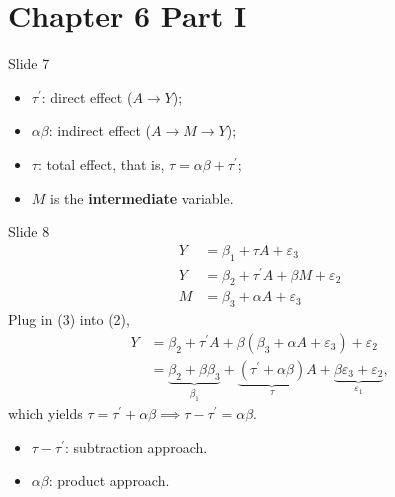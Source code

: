 \section*{Chapter 6 Part I}
\begin{Regular}{Slide 7}
    \begin{center}
    \end{center}
    \begin{itemize}
        \item $ \tau^\prime $: direct effect ($ A\to Y $);
        \item $ \alpha\beta $: indirect effect ($ A\to M\to Y $);
        \item $ \tau $: total effect, that is, $ \tau=\alpha\beta+\tau^\prime $;
        \item $ M $ is the \textbf{intermediate} variable.
    \end{itemize}
\end{Regular}
\begin{Regular}{Slide 8}
    \begin{align}
        Y & =\beta_1+\tau A + \varepsilon_3               \\
        Y & =\beta_2+\tau^\prime A+\beta M +\varepsilon_2 \\
        M & =\beta_3+\alpha A+\varepsilon_3
    \end{align}
    Plug in (3) into (2),
    \begin{align*}
        Y
         & =\beta_2+\tau^\prime A +\beta(\beta_3+\alpha A+\varepsilon_3)+\varepsilon_2                                                                                \\
         & =\underbrace{\beta_2+\beta\beta_3}_{\beta_1}+\underbrace{(\tau^\prime+\alpha\beta)}_{\tau}A+\underbrace{\beta\varepsilon_3+\varepsilon_2}_{\varepsilon_1},
    \end{align*}
    which yields $ \tau=\tau^\prime+\alpha\beta\implies \tau-\tau^\prime=\alpha\beta $.
    \begin{itemize}
        \item $ \tau-\tau^\prime $: subtraction approach.
        \item $ \alpha\beta $: product approach.
    \end{itemize}
\end{Regular}
